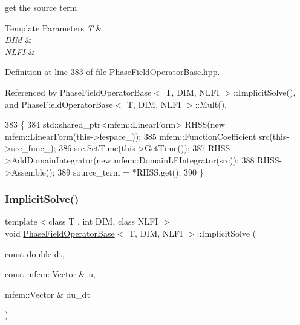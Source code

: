 get the source term 


\begin{DoxyTemplParams}{Template Parameters}
{\em T} & \\
\hline
{\em D\+IM} & \\
\hline
{\em N\+L\+FI} & \\
\hline
\end{DoxyTemplParams}


Definition at line 383 of file Phase\+Field\+Operator\+Base.\+hpp.



Referenced by Phase\+Field\+Operator\+Base$<$ T, D\+I\+M, N\+L\+F\+I $>$\+::\+Implicit\+Solve(), and Phase\+Field\+Operator\+Base$<$ T, D\+I\+M, N\+L\+F\+I $>$\+::\+Mult().


\begin{DoxyCode}
383                                                                                         \{
384   std::shared\_ptr<mfem::LinearForm> RHSS(\textcolor{keyword}{new} mfem::LinearForm(this->fespace\_));
385   mfem::FunctionCoefficient src(this->src\_func\_);
386   src.SetTime(this->GetTime());
387   RHSS->AddDomainIntegrator(\textcolor{keyword}{new} mfem::DomainLFIntegrator(src));
388   RHSS->Assemble();
389   source\_term = *RHSS.get();
390 \}
\end{DoxyCode}
\mbox{\label{classPhaseFieldOperatorBase_ac1be84d201e35ba329090cdda6a4bfc5}} 
\subsubsection{\texorpdfstring{Implicit\+Solve()}{ImplicitSolve()}}
{\footnotesize\ttfamily template$<$class T , int D\+IM, class N\+L\+FI $>$ \\
void \hyperlink{classPhaseFieldOperatorBase}{Phase\+Field\+Operator\+Base}$<$ T, D\+IM, N\+L\+FI $>$\+::Implicit\+Solve (\begin{DoxyParamCaption}\item[{const double}]{dt,  }\item[{const mfem\+::\+Vector \&}]{u,  }\item[{mfem\+::\+Vector \&}]{du\+\_\+dt }\end{DoxyParamCaption})\hspace{0.3cm}{\ttfamily [virtual]}}



